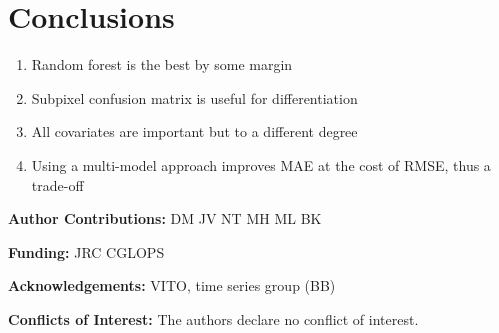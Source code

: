 \documentclass[a4paper,10pt]{article}
\newcommand{\minisection}[1]{\medskip \textbf{#1:}}
\begin{document}
\section{Conclusions}

\begin{enumerate}
 \item Random forest is the best by some margin
 \item Subpixel confusion matrix is useful for differentiation
 \item All covariates are important but to a different degree
 \item Using a multi-model approach improves MAE at the cost of RMSE, thus a trade-off
\end{enumerate}

\minisection{Author Contributions} DM JV NT MH ML BK

\minisection{Funding} JRC CGLOPS

\minisection{Acknowledgements} VITO, time series group (BB)

\minisection{Conflicts of Interest} The authors declare no conflict of interest.


\printnoidxglossary[type=acronym]


\end{document}
